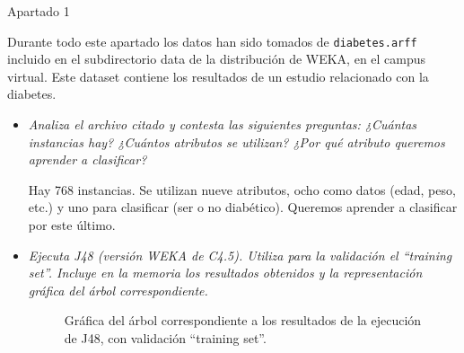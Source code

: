 \documentclass[11pt, a4paper, spanish, openright, twoside]{book}
\begin{document}
\begin{section}{Apartado 1}
	
	Durante todo este apartado los datos han sido tomados de \texttt{diabetes.arff} incluido en el subdirectorio data de la distribución de WEKA, en el campus virtual. Este dataset contiene los resultados de un estudio relacionado con la diabetes.
	
	\begin{itemize} 
	\item \textit{Analiza el archivo citado y contesta las siguientes preguntas: ¿Cuántas instancias hay? ¿Cuántos 
	atributos se utilizan? ¿Por qué atributo queremos aprender a clasificar?}

	Hay 768 instancias. Se utilizan nueve atributos, ocho como datos (edad, peso, etc.)  y uno para clasificar (ser o no diabético). Queremos aprender a clasificar por este último.
 
	\item \textit{Ejecuta J48 (versión WEKA de C4.5). Utiliza para la validación el “training set”. Incluye en la 
	memoria los resultados obtenidos y la representación gráfica del árbol correspondiente.}


\begin{figure}
	\hspace{-1cm}
    	\caption{Gráfica del árbol correspondiente a los resultados de la ejecución de J48, con validación “training set”.}
\end{figure}

\noindent{}
\end{itemize}
\end{section}
\end{document}
